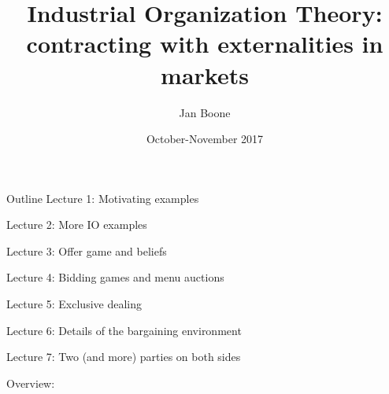 \documentclass[11pt,english]{beamer}
\institute{Tilec}
\title{Industrial Organization Theory: contracting with externalities in markets}
\author{Jan Boone} \date{October-November 2017}
\begin{document}
\frame{\titlepage}

\begin{frame}[allowframebreaks]{Outline}
Lecture 1: Motivating examples

\tableofcontents[part=1,hideallsubsections]

\newpage

Lecture 2: More IO examples

\tableofcontents[part=2,hideallsubsections]


\newpage

Lecture 3: Offer game and beliefs

\tableofcontents[part=3,hideallsubsections]

Lecture 4: Bidding games and menu auctions

\tableofcontents[part=4,hideallsubsections]

\newpage

Lecture 5: Exclusive dealing

\tableofcontents[part=5,hideallsubsections]

Lecture 6: Details of the bargaining environment

\tableofcontents[part=6,hideallsubsections]

\newpage

Lecture 7: Two (and more) parties on both sides

\tableofcontents[part=7,hideallsubsections]

Overview:

\tableofcontents[part=8,hideallsubsections]

\end{frame}
\end{document}
